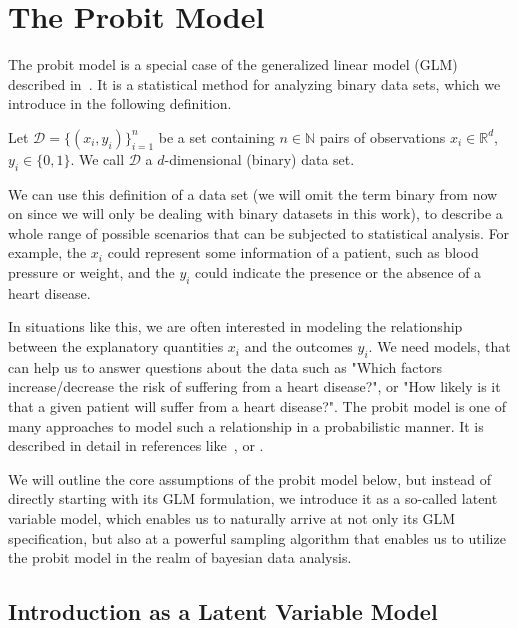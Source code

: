 \section{The Probit Model}

The probit model is a special case of the generalized linear model (GLM)
described in~\cite{glm-nelder}.
It is a statistical method for analyzing binary data sets,
which we introduce in the following definition.

\begin{definition}
    Let $\mathcal{D} = \{(x_i, y_i)\}_{i=1}^n$ be a set containing
    $n \in \mathbb{N}$ pairs of observations $x_i \in \mathbb{R}^d$,
    $y_i \in \{0, 1\}$.
    We call $\mathcal{D}$ a $d$-dimensional (binary) data set.
\end{definition}

\noindent We can use this definition of a data set
(we will omit the term binary from now on since we will only be dealing
with binary datasets in this work), to describe a whole range of possible scenarios
that can be subjected to statistical analysis.
For example, the $x_i$ could represent some information of a patient, such as
blood pressure or weight, and the $y_i$ could indicate the presence or
the absence of a heart disease.

In situations like this, we are often interested in modeling the
relationship between the explanatory quantities $x_i$ and the
outcomes $y_i$.
We need models, that can help us to answer questions about the data
such as "Which factors increase/decrease the risk of suffering from a heart disease?",
or "How likely is it that a given patient will suffer from a heart disease?".
The probit model is one of many approaches to model such a
relationship in a probabilistic manner.
It is described in detail in references like~\cite{glm-nelder},
\cite{glm-agresti} or \cite{regression-fahrmeir}.

We will outline the core assumptions of the probit model below,
but instead of directly starting with its GLM formulation, we introduce
it as a so-called latent variable model, which enables us to
naturally arrive at not only its GLM specification, but also
at a powerful sampling algorithm that enables us to utilize
the probit model in the realm of bayesian data analysis.

\subsection{Introduction as a Latent Variable Model}
\label{sec:probit-introduction}

